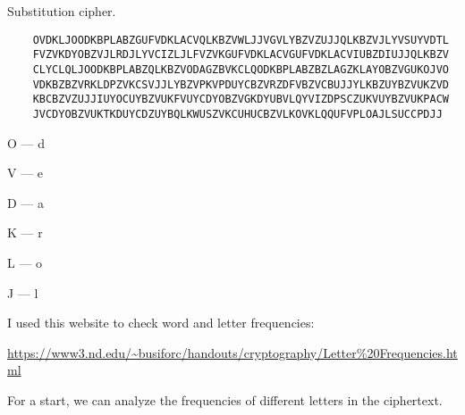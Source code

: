 \begin{problem}
  Substitution cipher.

  \color{zaffre}
  \begin{Verbatim}
    OVDKLJOODKBPLABZGUFVDKLACVQLKBZVWLJJVGVLYBZVZUJJQLKBZVJLYVSUYVDTL
    FVZVKDYOBZVJLRDJLYVCIZLJLFVZVKGUFVDKLACVGUFVDKLACVIUBZDIUJJQLKBZV
    CLYCLQLJOODKBPLABZQLKBZVODAGZBVKCLQODKBPLABZBZLAGZKLAYOBZVGUKOJVO
    VDKBZBZVRKLDPZVKCSVJJLYBZVPKVPDUYCBZVRZDFVBZVCBUJJYLKBZUYBZVUKZVD
    KBCBZVZUJJIUYOCUYBZVUKFVUYCDYOBZVGKDYUBVLQYVIZDPSCZUKVUYBZVUKPACW
    JVCDYOBZVUKTKDUYCDZUYBQLKWUSZVKCUHUCBZVLKOVKLQQUFVPLOAJLSUCCPDJJ
  \end{Verbatim}
  \color{black}
\end{problem}

\begin{Answer}

  O --- d

  V --- e

  D --- a

  K --- r

  L --- o

  J --- l


  \noindent
  I used this website to check word and letter frequencies:

  \noindent
  \color{crimson}
  \url{https://www3.nd.edu/~busiforc/handouts/cryptography/Letter%20Frequencies.html}
  \color{black}

  \noindent
  For a start, we can analyze the frequencies of different letters in the ciphertext.


\end{Answer}
